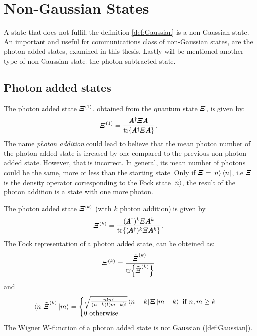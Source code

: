 \section{Non-Gaussian States} 
    A state that does not fulfill the definition \ref{def:Gaussian} is a non-Gaussian state.
    An important and useful for communications class of non-Gaussian states, are the photon 
    added states, examined in this thesis. Lastly will be mentioned another type of non-Gaussian
    state: the photon subtracted state.
    
    \subsection{Photon added states}
        \label{PAS}
        The photon added state $\Operator{\varXi}^{(1)}$, obtained from the quantum state $\Operator{\varXi}$,
        is given by:
        \begin{equation}
            \Operator{\varXi}^{(1)}=\frac{\Operator{A}^\dagger\Operator{\varXi}\Operator{A}}
            {\tr{\Operator{A}^\dagger\Operator{\varXi}\Operator{A}}}.
        \end{equation}
        The name \emph{photon addition} could lead to believe that the mean photon number of the 
        photon added state is icreased by one compared to the previous non photon added state.
        However, that is incorrect.
        In general, its mean number of photons could be the same, more or less than the starting state.
        Only if $\Operator{\varXi}=\ket{n}\bra{n}$, i.e $\Operator{\varXi}$ is the density operator corresponding to
        the Fock state $\ket{n}$, the result of the photon addition is a state with one more photon.

        The photon added state $\Operator{\varXi}^{(k)}$ (with $k$ photon addition) is given by
        \begin{equation}
            \Operator{\varXi}^{(k)}=\frac{(\Operator{A}^\dagger)^k\Operator{\varXi}\Operator{A}^k}
            {\tr{(\Operator{A}^\dagger)^k\Operator{\varXi}\Operator{A}^k}}.
        \end{equation}
        The Fock representation of a photon added state, can be obteined as:
        \begin{equation}
            \Operator{\varXi}^{(k)}=\frac{\tilde{\Operator{\varXi}}^{(k)}}{\tr{\tilde{\Operator{\varXi}}^{(k)}}}
            \label{eq:FR_photonAdded}
        \end{equation}
        and
        \begin{equation*}
            \bra{n}\tilde{\Operator{\varXi}}^{(k)}\ket{m}=
            \begin{cases}
                \sqrt{\frac{n!m!}{(n-k)!(m-k)!}}\bra*{n-k}\pmb{\Xi}\ket*{m-k}\mbox{\ if\ }n,m \geq k\\
                0\mbox{\ otherwise}.
            \end{cases}
        \end{equation*}
        The Wigner W-function of a photon added state is not Gaussian (\ref{def:Gaussian}).

